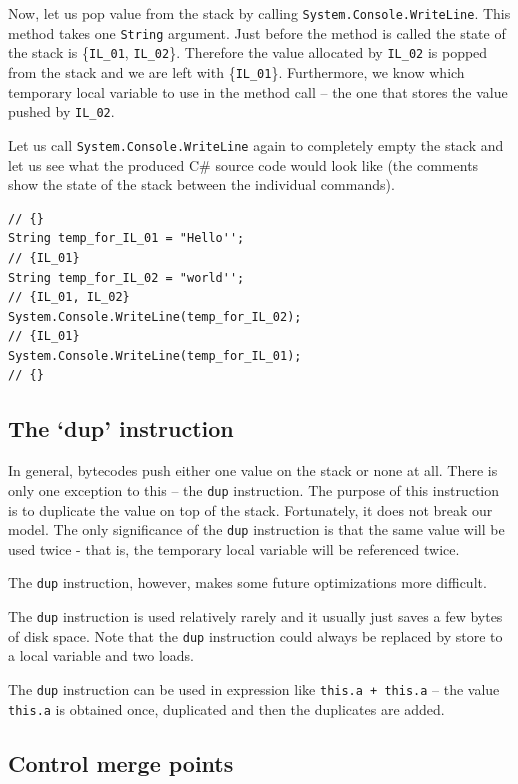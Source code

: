 \documentclass[12pt,twoside,notitlepage]{report}
\begin{document}
Now, let us pop value from the stack by calling 
\verb|System.Console.WriteLine|.  This method takes one
\verb|String| argument.  Just before the method is called
the state of the stack is \{\verb|IL_01|, \verb|IL_02|\}.
Therefore the value allocated by \verb|IL_02| is popped 
from the stack and we are left with \{\verb|IL_01|\}.  
Furthermore, we know which temporary local variable to
use in the method call -- the one that stores the value
pushed by \verb|IL_02|.

Let us call \verb|System.Console.WriteLine| again to completely
empty the stack and let us see what the produced C\# source code
would look like (the comments show the state of the stack 
between the individual commands).
\begin{verbatim}
// {}
String temp_for_IL_01 = "Hello'';
// {IL_01}
String temp_for_IL_02 = "world'';
// {IL_01, IL_02}
System.Console.WriteLine(temp_for_IL_02);
// {IL_01}
System.Console.WriteLine(temp_for_IL_01);
// {}
\end{verbatim}

\subsection{The `dup' instruction}

In general, bytecodes push either one value on the stack or none at all.
There is only one exception to this -- the \verb|dup| instruction.
The purpose of this instruction is to duplicate the value on top of the
stack.  Fortunately, it does not break our model.  The only significance
of the \verb|dup| instruction is that the same value will be used twice -
that is, the temporary local variable will be referenced twice.

The \verb|dup| instruction, however, makes some future optimizations 
more difficult.

The \verb|dup| instruction is used relatively rarely and 
it usually just saves a few bytes of disk space.
Note that the \verb|dup| instruction could always be replaced
by store to a local variable and two loads.

The \verb|dup| instruction can be used in expression like 
\verb|this.a + this.a| -- the value \verb|this.a| is obtained
once, duplicated and then the duplicates are added.

\subsection{Control merge points}
\end{document}
